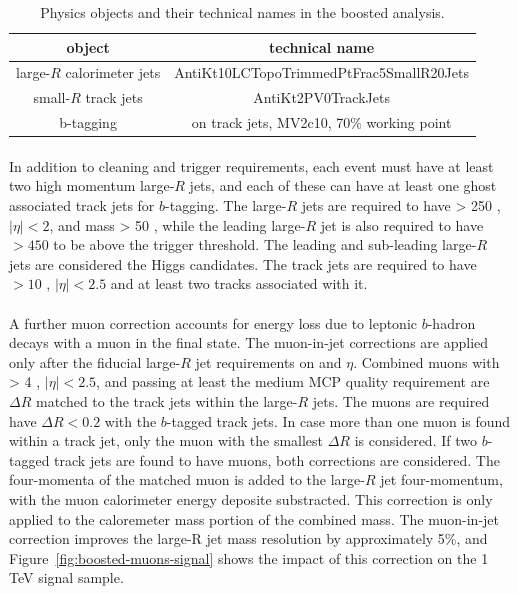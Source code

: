 \begin{table}[bhp]
\begin{center}
\begin{tabular}{c|c}
  object & technical name \\
  \hline
  large-$R$ calorimeter jets & AntiKt10LCTopoTrimmedPtFrac5SmallR20Jets \\
  small-$R$ track jets       & AntiKt2PV0TrackJets \\
  b-tagging                  & on track jets, MV2c10, 70$\%$ working point \\
\end{tabular}
\caption{Physics objects and their technical names in the boosted analysis.} %
\label{tab:boosted-objects}
\end{center}
\end{table}

\paragraph{}
In addition to cleaning and trigger requirements, each event must have at least two high momentum large-$R$ jets, and each of these can have at least one ghost associated track jets for $b$-tagging. The large-$R$ jets are required to have \pt > 250 \GeV , $|\eta| < 2$,  and mass > 50 \GeV, while the leading \pt large-$R$ jet is also required to have \pt $> 450$ \GeV to be above the trigger threshold. The leading and sub-leading large-$R$ jets are considered the Higgs candidates. The track jets are required to have \pt $> 10 $ \GeV , $|\eta| < 2.5$ and at least two tracks associated with it.

\paragraph{}
A further muon correction accounts for energy loss due to leptonic $b$-hadron decays with a muon in the final state. The muon-in-jet corrections are applied only after the fiducial large-$R$ jet requirements on \pt and $\eta$. Combined muons with \pt > 4 \GeV, $|\eta| < 2.5$, and passing at least the medium MCP quality requirement are $\Delta R$ matched to the track jets within the large-$R$ jets. The muons are required have $\Delta R < 0.2$ with the $b$-tagged track jets. In case more than one muon is found within a track jet, only the muon with the smallest $\Delta R$ is considered. If two $b$-tagged track jets are found to have muons, both corrections are considered. The four-momenta of the matched muon is added to the large-$R$ jet four-momentum, with the muon calorimeter energy deposite substracted. This correction is only applied to the caloremeter mass portion of the combined mass. The muon-in-jet correction improves the large-R jet mass resolution by approximately 5\%, and Figure~\ref{fig:boosted-muons-signal} shows the impact of this correction on the 1 TeV signal sample.


